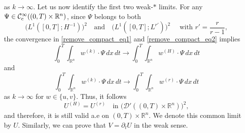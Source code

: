 \documentclass[11pt,reqno]{amsart}
\newcommand{\ity}{\infty}
\begin{document}
	as $k\to \ity$. Let us now identify the first two weak-$*$ limits. For any $\Psi\in \mathcal{C}^\infty_{\rm c}((0,T)\times\mathbb R^n)$, since $\Psi$ belongs to both
	\[
	\bigl(L^1([0,T];H^{-1})\bigr)^2 \quad\text{and}\quad \bigl(L^1([0,T];L^{r'})\bigr)^2\quad\text{ with } r'=\frac{r}{r-1},
	\]
	the convergence in \eqref{remove_compact_eq1} and
	\eqref{remove_compact_eq2} implies
	\[
	\int_0^T\int_{\mathbb R^n}w^{(k)}\cdot\Psi\,dx\,dt
	\to
	\int_0^T\int_{\mathbb R^n}w^{(H)}\cdot\Psi\,dx\,dt 
	\]
	and
	\[
	\int_0^T\int_{\mathbb R^n}w^{(k)}\cdot\Psi\,dx\,dt
	\to
	\int_0^T\int_{\mathbb R^n}w^{(r)}\cdot\Psi\,dx\,dt
	\]
	as $k\to \ity$ for $w\in \{u,v\}$. Thus, it follows
	\[
	U^{(H)}=U^{(r)}
	\quad\text{in }
	\bigl(\mathcal D'((0,T)\times\mathbb R^n)\bigr)^2,
	\]
	and therefore, it is still valid a.e on $(0,T)\times\mathbb R^n$. We denote this common limit by $U$. Similarly, we can prove that $V=\partial_tU$ in the weak sense. \medskip
	
\end{document}
